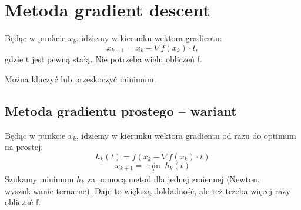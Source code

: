 \section{Metoda gradient descent}
Będąc w punkcie \( x_k \), idziemy w kierunku wektora gradientu:
\[
	x_{k+1} = x_k - \nabla f(x_k) \cdot t,
\]
gdzie t jest pewną stałą. Nie potrzeba wielu obliczeń f.
\begin{warning}
	Można kluczyć lub przeskoczyć minimum.
\end{warning}

\subsection{Metoda gradientu prostego – wariant}
Będąc w punkcie \( x_k \), idziemy w kierunku wektora gradientu od razu do optimum na prostej:
\[
	h_k(t) = f(x_k - \nabla f(x_k) \cdot t)
\]
\[
	x_{k+1} = \min_{t}\; h_k(t)
\]
Szukamy minimum \( h_k \) za pomocą metod dla jednej zmiennej (Newton, wyszukiwanie ternarne). Daje to większą dokładność, ale też trzeba więcej razy obliczać f.